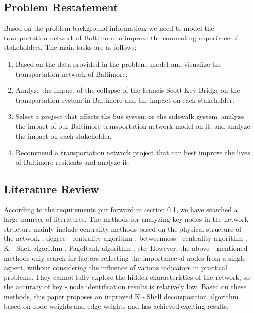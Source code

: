 \documentclass{mcmthesis}
\begin{document}
\subsection{Problem Restatement}
\label{sec:problem}

Based on the problem background information, we need to model the transportation network of Baltimore to improve the commuting experience of stakeholders. The main tasks are as follows:

\begin{enumerate}
  \item Based on the data provided in the problem, model and visualize the transportation network of Baltimore.
  \item Analyze the impact of the collapse of the Francis Scott Key Bridge on the transportation system in Baltimore and the impact on each stakeholder.
  \item Select a project that affects the bus system or the sidewalk system, analyze the impact of our Baltimore transportation network model on it, and analyze the impact on each stakeholder.
  \item Recommend a transportation network project that can best improve the lives of Baltimore residents and analyze it.
\end{enumerate}

\subsection{Literature Review}
\label{sec:zongshu}

According to the requirements put forward in section \ref{sec:problem}, we have searched a large number of literatures. The methods for analyzing key nodes in the network structure mainly include centrality methods based on the physical structure of the network \citep{ren2014}, degree - centrality algorithm \citep{zhang2017}, betweenness - centrality algorithm \citep{bergamini2014}, K - Shell algorithm \citep{maji2020}, PageRank algorithm \citep{tortosa2021}, etc. However, the above - mentioned methods only search for factors reflecting the importance of nodes from a single aspect, without considering the influence of various indicators in practical problems. They cannot fully explore the hidden characteristics of the network, so the accuracy of key - node identification results is relatively low. Based on these methods, this paper proposes an improved K - Shell decomposition algorithm based on node weights and edge weights and has achieved exciting results.
\end{document}
